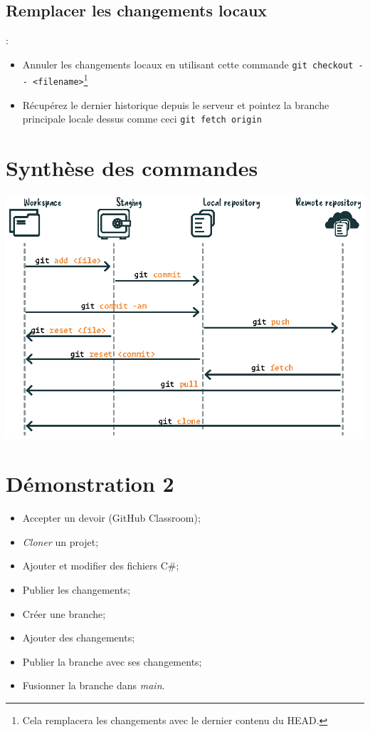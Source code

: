 \documentclass[10pt]{beamer}
\begin{document}
\subsection{Remplacer les changements locaux}
\begin{frame}{\secname : \subsecname}
    \begin{itemize}
        \item Annuler les changements locaux en utilisant cette commande \lstinline[language=git]!git checkout -- <filename>!\footnote{Cela remplacera les changements avec le dernier contenu du HEAD.}
        \item Récupérez le dernier historique depuis le serveur et pointez la branche principale locale dessus comme ceci \lstinline[language=git]!git fetch origin!
    \end{itemize}
\end{frame}

\section{Synthèse des commandes}
\begin{frame}{\secname}
    \centerline{\includegraphics[height=0.8\textheight]{img/synthese.eps}}
\end{frame}

\section{Démonstration 2}
\begin{frame}{\secname}
    \begin{itemize}
        \item Accepter un devoir (GitHub Classroom);
        \item \emph{Cloner} un projet;
        \item Ajouter et modifier des fichiers C\#;
        \item Publier les changements;
        \item Créer une branche;
        \item Ajouter des changements;
        \item Publier la branche avec ses changements;
        \item Fusionner la branche dans \emph{main}.
    \end{itemize}
\end{frame}
\end{document}
